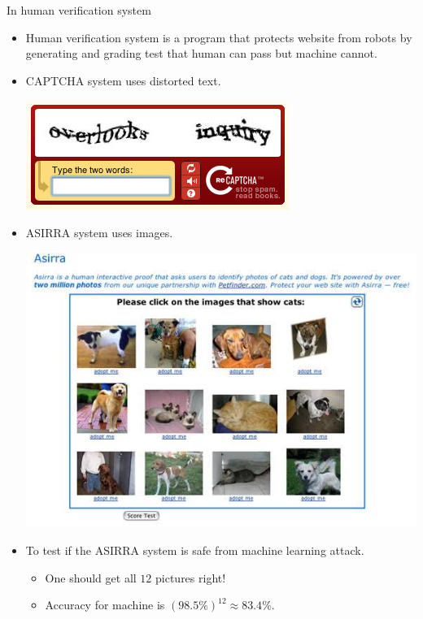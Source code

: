 \documentclass[first=purple,second=dgreen,logo=redexc]{aaltoslides}
\begin{document}
{\begin{frame}{In human verification system}
	\begin{itemize}
		\item Human verification system is a program that protects website from robots by generating and grading test that human can pass but machine cannot.
		\item CAPTCHA system \citep{Ahn03captcha} uses distorted text.
		\begin{center}
			\includegraphics[scale=0.2]{./figures/captcha.png}
		\end{center}
		\item ASIRRA system \citep{Elson07asirra} uses images.
		\begin{center}
			\includegraphics[scale=0.2]{./figures/assira.jpg}
		\end{center}
		\item To test if the ASIRRA system is safe from machine learning attack.
		\begin{itemize}
			\footnotesize
			\item One should get all $12$ pictures right!
			\item Accuracy for machine is $(98.5\%)^{12} \approx 83.4\%$.
		\end{itemize}
	\end{itemize}
\end{frame}

}
\end{document}
